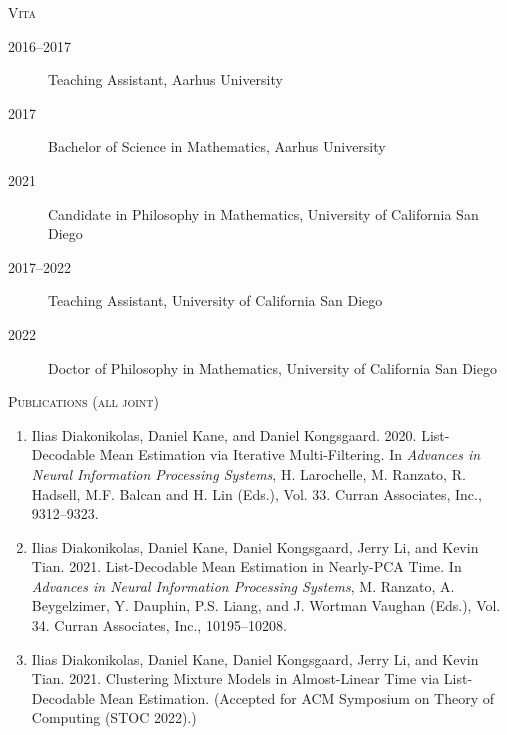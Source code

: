 \documentclass[letterpaper,oneside,english,11pt,openany]{memoir}
\begin{document}
\clearpage



\begin{center}
  \Large\scshape Vita
\end{center}
\begin{description}
  \item[2016--2017] Teaching Assistant, Aarhus University
  \item[2017] Bachelor of Science in Mathematics, Aarhus University
  \item[2021] Candidate in Philosophy in Mathematics, University of California San Diego
  \item[2017--2022] Teaching Assistant, University of California San Diego
  \item[2022] Doctor of Philosophy in Mathematics, University of California San Diego
\end{description}

\begin{center}
  \Large\scshape Publications (all joint)
\end{center}
\begin{enumerate}[$\bullet$]
  \item Ilias Diakonikolas, Daniel Kane, and Daniel Kongsgaard. 2020. List-Decodable Mean Estimation via Iterative Multi-Filtering. In \emph{Advances in Neural Information Processing Systems}, H. Larochelle, M. Ranzato, R. Hadsell, M.F. Balcan and H. Lin (Eds.), Vol. 33. Curran Associates, Inc., 9312--9323.

  \item Ilias Diakonikolas, Daniel Kane, Daniel Kongsgaard, Jerry Li, and Kevin Tian. 2021. List-Decodable Mean Estimation in Nearly-PCA Time. In \emph{Advances in Neural Information Processing Systems}, M. Ranzato, A. Beygelzimer, Y. Dauphin, P.S. Liang, and J. Wortman Vaughan (Eds.), Vol. 34. Curran Associates, Inc., 10195--10208.

  \item Ilias Diakonikolas, Daniel Kane, Daniel Kongsgaard, Jerry Li, and Kevin Tian. 2021. Clustering Mixture Models in Almost-Linear Time via List-Decodable Mean Estimation. (Accepted for ACM Symposium on Theory of Computing (STOC 2022).)
\end{enumerate}


\end{document}
